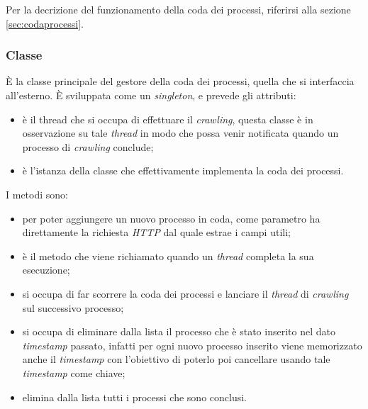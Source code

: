 \documentclass[tesi.tex]{subfiles}
\begin{document}
Per la decrizione del funzionamento della coda dei processi,
riferirsi alla sezione \ref{sec:codaprocessi}.

\subsubsection{Classe }
\begin{center}
\end{center}
\`E la classe principale del gestore della coda dei processi, quella
che si interfaccia all'esterno. \`E
sviluppata come un \emph{singleton}, e prevede gli attributi:
\begin{itemize}
\item {} \`e il thread che si occupa di effettuare il
  \emph{crawling}, questa classe \`e in osservazione su tale
  \emph{thread} in modo che possa venir notificata quando un processo
  di \emph{crawling} conclude;
\item {} \`e l'istanza della classe che effettivamente
  implementa la coda dei processi.
\end{itemize}
I metodi sono:
\begin{itemize}
\item {} per poter aggiungere un nuovo processo in
  coda, come parametro ha direttamente la richiesta \emph{HTTP} dal
  quale estrae i campi utili;
\item {} \`e il metodo che viene richiamato quando un
  \emph{thread} completa la sua esecuzione;
\item {} si occupa di far scorrere la coda dei
  processi e lanciare il \emph{thread} di \emph{crawling} sul
  successivo processo;
\item {} si occupa di eliminare dalla lista il
  processo che \`e stato inserito nel dato \emph{timestamp} passato,
  infatti per ogni nuovo processo inserito viene memorizzato anche il
  \emph{timestamp} con l'obiettivo di poterlo poi cancellare usando
  tale \emph{timestamp} come chiave;
\item {} elimina dalla lista tutti i processi
  che sono conclusi. 
\end{itemize}
\end{document}

